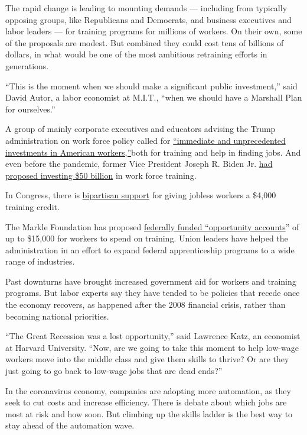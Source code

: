 The rapid change is leading to mounting demands --- including from
typically opposing groups, like Republicans and Democrats, and business
executives and labor leaders --- for training programs for millions of
workers. On their own, some of the proposals are modest. But combined
they could cost tens of billions of dollars, in what would be one of the
most ambitious retraining efforts in generations.

``This is the moment when we should make a significant public
investment,'' said David Autor, a labor economist at M.I.T., ``when we
should have a Marshall Plan for ourselves.''

A group of mainly corporate executives and educators advising the Trump
administration on work force policy called for
\href{https://www.commerce.gov/sites/default/files/2020-05/AWPABCalltoActionFINAL051520.pdf}{``immediate
and unprecedented investments in American workers,''}both for training
and help in finding jobs. And even before the pandemic, former Vice
President Joseph R. Biden Jr.
\href{https://twitter.com/JoeBiden/status/1183170484269174784}{had
proposed investing \$50 billion} in work force training.

In Congress, there is
\href{https://www.klobuchar.senate.gov/public/index.cfm/2020/5/klobuchar-sasse-booker-scott-introduce-legislation-to-help-unemployed-american-workers-access-skills-training-programs-during-coronavirus-pandemic}{bipartisan
support} for giving jobless workers a \$4,000 training credit.

The Markle Foundation has proposed
\href{https://www.markle.org/stimulus-american-opportunity}{federally
funded ``opportunity accounts}'' of up to \$15,000 for workers to spend
on training. Union leaders have helped the administration in an effort
to expand federal apprenticeship programs to a wide range of industries.

Past downturns have brought increased government aid for workers and
training programs. But labor experts say they have tended to be policies
that recede once the economy recovers, as happened after the 2008
financial crisis, rather than becoming national priorities.

``The Great Recession was a lost opportunity,'' said Lawrence Katz, an
economist at Harvard University. ``Now, are we going to take this moment
to help low-wage workers move into the middle class and give them skills
to thrive? Or are they just going to go back to low-wage jobs that are
dead ends?''

In the coronavirus economy, companies are adopting more automation, as
they seek to cut costs and increase efficiency. There is debate about
which jobs are most at risk and how soon. But climbing up the skills
ladder is the best way to stay ahead of the automation wave.

